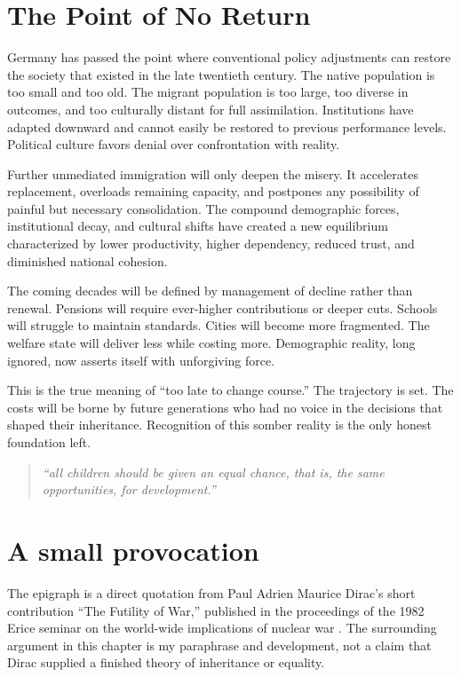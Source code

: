 ﻿\documentclass[12pt,a4paper]{book}
\begin{document}
\section{The Point of No Return}

Germany has passed the point where conventional policy adjustments can restore the society that existed in the late twentieth century. The native population is too small and too old. The migrant population is too large, too diverse in outcomes, and too culturally distant for full assimilation. Institutions have adapted downward and cannot easily be restored to previous performance levels. Political culture favors denial over confrontation with reality.

Further unmediated immigration will only deepen the misery. It accelerates replacement, overloads remaining capacity, and postpones any possibility of painful but necessary consolidation. The compound demographic forces, institutional decay, and cultural shifts have created a new equilibrium characterized by lower productivity, higher dependency, reduced trust, and diminished national cohesion.

The coming decades will be defined by management of decline rather than renewal. Pensions will require ever-higher contributions or deeper cuts. Schools will struggle to maintain standards. Cities will become more fragmented. The welfare state will deliver less while costing more. Demographic reality, long ignored, now asserts itself with unforgiving force.

This is the true meaning of ``too late to change course.'' The trajectory is set. The costs will be borne by future generations who had no voice in the decisions that shaped their inheritance. Recognition of this somber reality is the only honest foundation left.



\begin{quote}
\itshape
``all children should be given an equal chance, that is, the same
opportunities, for development.''
\end{quote}

\section{A small provocation}

The epigraph is a direct quotation from Paul Adrien Maurice Dirac's short
contribution ``The Futility of War,'' published in the proceedings of the
1982 Erice seminar on the world-wide implications of nuclear war
\cite[pp.~173--174]{dirac-81}.  The surrounding argument in this chapter is
my paraphrase and development, not a claim that Dirac supplied a finished
theory of inheritance or equality.
\end{document}
